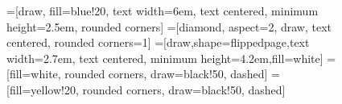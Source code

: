 \begin{figure}[h!]


  \makeatletter

  =[draw, fill=blue!20, text width=6em, text centered, minimum height=2.5em, rounded corners]
  =[diamond, aspect=2, draw, text centered, rounded corners=1]
  =[draw,shape=flippedpage,text width=2.7em, text centered,
  minimum height=4.2em,fill=white]
  =[fill=white, rounded corners, draw=black!50, dashed]
  =[fill=yellow!20, rounded corners, draw=black!50, dashed]

  \begin{center}
\end{center}
\end{figure}

